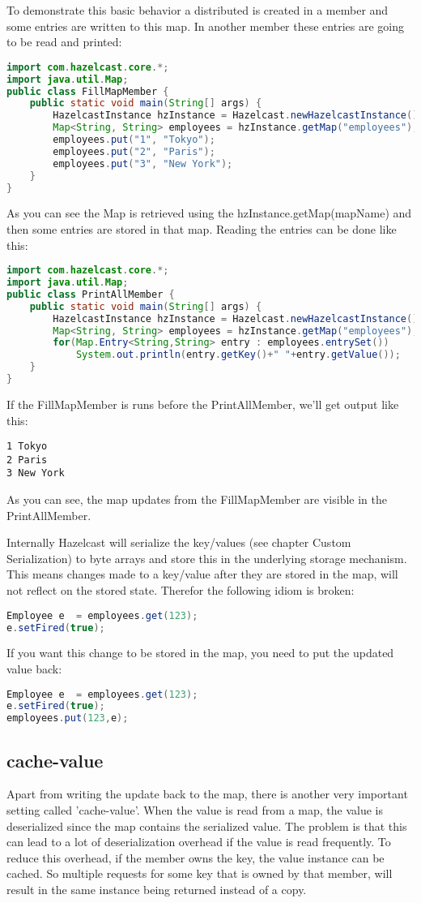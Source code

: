 To demonstrate this basic behavior a distributed is created in a member and some entries are written to this map. In another member these entries are going to be read and printed:
\begin{lstlisting}[language=java]
import com.hazelcast.core.*;
import java.util.Map;
public class FillMapMember {
    public static void main(String[] args) {
        HazelcastInstance hzInstance = Hazelcast.newHazelcastInstance();
        Map<String, String> employees = hzInstance.getMap("employees");
        employees.put("1", "Tokyo");
        employees.put("2", "Paris");
        employees.put("3", "New York");
    }
}
\end{lstlisting}
As you can see the Map is retrieved using the hzInstance.getMap(mapName) and then some entries are stored in that map. Reading the entries can be done like this:
\begin{lstlisting}[language=java]
import com.hazelcast.core.*;
import java.util.Map;
public class PrintAllMember {
    public static void main(String[] args) {
        HazelcastInstance hzInstance = Hazelcast.newHazelcastInstance();
        Map<String, String> employees = hzInstance.getMap("employees");
        for(Map.Entry<String,String> entry : employees.entrySet())
            System.out.println(entry.getKey()+" "+entry.getValue());
    }
}
\end{lstlisting}
If the FillMapMember is runs before the PrintAllMember, we'll get output like this:
\begin{lstlisting}
1 Tokyo
2 Paris
3 New York
\end{lstlisting}
As you can see, the map updates from the FillMapMember are visible in the PrintAllMember.

Internally Hazelcast will serialize the key/values (see chapter Custom Serialization) to byte arrays and store this in the underlying storage mechanism. This means changes made to a key/value after they are stored in the map, will not reflect on the stored state. Therefor the following idiom is broken:
\begin{lstlisting}[language=java]
Employee e  = employees.get(123);
e.setFired(true);
\end{lstlisting}
If you want this change to be stored in the map, you need to put the updated value back:
\begin{lstlisting}[language=java]
Employee e  = employees.get(123);
e.setFired(true);
employees.put(123,e);
\end{lstlisting}

\subsection*{cache-value}
Apart from writing the update back to the map, there is another very important setting called 'cache-value'. When the value is read from a map, the value is deserialized since the map contains the serialized value. The problem is that this can lead to a lot of deserialization overhead if the value is read frequently. To reduce this overhead, if the member owns the key, the value instance can be cached. So multiple requests for some key that is owned by that member, will result in the same instance being returned instead of a copy. 


